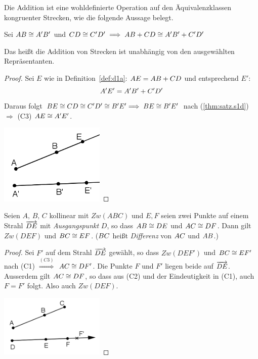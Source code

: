Die Addition ist eine wohldefinierte Operation auf den Äquivalenzklassen kongruenter Strecken, wie
die folgende Aussage belegt.


\begin{thm}\label{thm:satz.s1e}
    Sei ${AB} \cong {A'B'}$ und ${CD} \cong {C'D'}\; \Longrightarrow\; {AB} +
    {CD} \cong {A'B'} + {C'D'}$

    Das heißt die Addition von Strecken ist unabhängig von den ausgewählten Repräsentanten.
\end{thm}

\begin{proof}
    Sei $E$ wie in Definition~\ref{def:d1a}: ${AE} = {AB}+{CD}$ und entsprechend $E':$
    $$
        {A'E'} = {A'B'} + {C'D'}
    $$
    Daraus folgt ${BE} \cong {CD} \cong {C'D'} \cong {B'E'} \Longrightarrow\;
    {BE} \cong {B'E'}$ nach (\ref{thm:satz.s1d}) $\Longrightarrow$ (C3)
    ${AE}\cong{A'E'}$.

    \centerline{\includegraphics[width=5cm]{BILDER/1-2-03-Add.png}}
\end{proof}

\begin{thm}\label{thm:satz.s1f}
    Seien $A,\, B,\, C$ kollinear mit $Zw(ABC)$ und $E,F$ seien zwei Punkte auf einem Strahl
    $\mbox{${\overrightarrow{DE}}$}$ mit {\em Ausgangspunkt} $D$, so dass ${AB} \cong {DE}$ und ${AC} \cong
    {DF}$. Dann gilt $Zw(DEF)$ und ${BC} \cong {EF}$.  (${BC}$ heißt
    \emph{Differenz} von ${AC}$ und ${AB}$.)
\end{thm}

\begin{proof}
    Sei $F'$ auf dem Strahl $\mbox{${\overrightarrow{DE}}$}$ gewählt, so dass $Zw(DEF')$ und ${BC} \cong {EF'}$
    nach (C1) $\stackrel{(C3)}{\Longrightarrow}$ ${AC} \cong {DF'}$. Die Punkte $F$ und
    $F'$ liegen beide auf $\mbox{${\overrightarrow{DE}}$}$. Ausserdem gilt ${AC} \cong {DF}$, so dass aus (C2) und
    der Eindeutigkeit in (C1), auch $F=F'$ folgt. Also auch $Zw(DEF)$.

    \centerline{\includegraphics[width=5cm]{BILDER/1-2-04-Diff.png}}
\end{proof}

